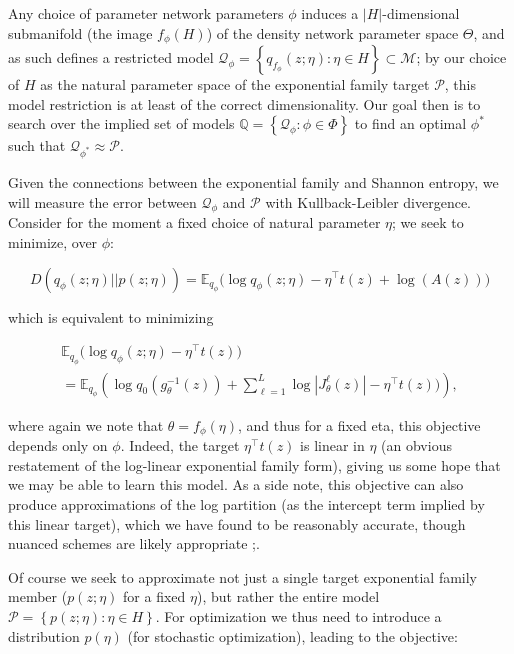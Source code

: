 \documentclass[twoside]{article}
\begin{document}
Any choice of parameter network parameters $\phi$ induces a $|H|$-dimensional submanifold (the image $f_\phi(H)$) of the density network parameter space $\Theta$, and as such defines a restricted model $\mathcal{Q}_\phi = \left\{ q_{f_{\phi}}(z; \eta): \eta \in H\right\} \subset \mathcal{M}$; by our choice of $H$ as the natural parameter space of the exponential family target $\mathcal{P}$, this model restriction is at least of the correct dimensionality.
Our goal then is to search over the implied set of models $\mathbb{Q} = \left\{ \mathcal{Q}_\phi : \phi \in \Phi \right\}$ to find an optimal $\phi^*$ such that $\mathcal{Q}_{\phi^*} \approx \mathcal{P}$. 

Given the connections between the exponential family and Shannon entropy, we will measure the error between $\mathcal{Q}_{\phi}$ and $\mathcal{P}$ with Kullback-Leibler divergence.  Consider for the moment a fixed choice of natural parameter $\eta$; we seek to minimize, over $\phi$:

{\small 
\begin{equation} D\left( q_\phi(z;\eta) || p(z;\eta) \right) = \mathbb{E}_{q_\phi} \Bigg( \log q_\phi(z;\eta) - \eta^\top t(z) + \log(A(z)) \Bigg) 
\label{eq:5}
\end{equation}}

which is equivalent to minimizing

{\small 
\begin{multline}  
\mathbb{E}_{q_\phi} \Bigg( \log q_\phi(z;\eta) - \eta^\top t(z) \Bigg) \\ = \mathbb{E}_{q_\phi} \left( \log q_0\left( g_\theta^{-1}(z)\right) + \sum_{\ell=1}^L  \log | J^\ell_\theta(z) | - \eta^\top t(z)) \right),
\label{eq:51}
\end{multline}}

where again we note that $\theta = f_\phi(\eta)$, and thus for a fixed eta, this objective depends only on $\phi$.  Indeed, the target $\eta^\top t(z)$ is linear in $\eta$ (an obvious restatement of the log-linear exponential family form), giving us some hope that we may be able to learn this model.  As a side note, this objective can also produce approximations of the log partition (as the intercept term implied by this linear target), which we have found to be reasonably accurate, though nuanced schemes are likely appropriate \citep{papamakarios2015distilling};.

Of course we seek to approximate not just a single target exponential family member ($p(z;\eta)$ for a fixed $\eta$), but rather the entire model $\mathcal{P} = \left\{p(z;\eta): \eta \in H\right\}$.   For optimization we thus need to introduce a distribution $p(\eta)$ (for stochastic optimization), leading to the objective: 
\end{document}
